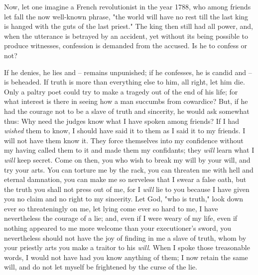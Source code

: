 Now, let one imagine a French revolutionist in the year 1788, who among 
friends let fall the now well-known phrase, "{}the world will have no rest 
till the last king is hanged with the guts of the last priest."{} The king 
then still had all power, and, when the utterance is betrayed by an accident, 
yet without its being possible to produce witnesses, confession is demanded 
from the accused. Is he to confess or not?

If he denies, he lies and -- remains unpunished; if he confesses, he is candid 
and -- is beheaded. If truth is more than everything else to him, all right, 
let him die. Only a paltry poet could try to make a tragedy out of the end of 
his life; for what interest is there in seeing how a man succumbs from 
cowardice? But, if he had the courage not to be a slave of truth and 
sincerity, he would ask somewhat thus: Why need the judges know what I have 
spoken among friends? If I had \textit{wished} them to know, I should have 
said it to them as I said it to my friends. I will not have them know it. They 
force themselves into my confidence without my having called them to it and 
made them my confidants; they \textit{will} learn what I \textit{will} keep 
secret. Come on then, you who wish to break my will by your will, and try your 
arts. You can torture me by the rack, you can threaten me with hell and 
eternal damnation, you can make me so nerveless that I swear a false oath, but 
the truth you shall not press out of me, for I \textit{will} lie to you 
because I have given you no claim and no right to my sincerity. Let God, 
"{}who is truth,"{} look down ever so threateningly on me, let lying come ever 
so hard to me, I have nevertheless the courage of a lie; and, even if I were 
weary of my life, even if nothing appeared to me more welcome than your 
executioner's sword, you nevertheless should not have the joy of finding in me 
a slave of truth, whom by your priestly arts you make a traitor to his 
\textit{will}. When I spoke those treasonable words, I would not have had you 
know anything of them; I now retain the same will, and do not let myself be 
frightened by the curse of the lie.

